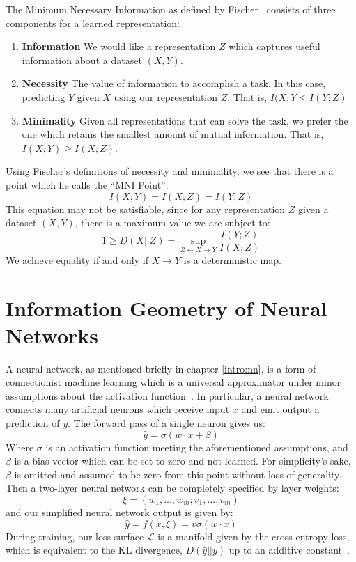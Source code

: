 The Minimum Necessary Information as defined by Fischer~\cite{fischer2020conditional} consists of three components for a learned representation:
\begin{enumerate}
	\item \textbf{Information} We would like a representation $Z$ which captures useful information about a dataset $(X, Y)$.
	\item \textbf{Necessity} The value of information to accomplish a task. In this case, predicting $Y$ given $X$ using our representation $Z$. That is, $I(X; Y \leq I(Y; Z)$
	\item \textbf{Minimality} Given all representations that can solve the task, we prefer the one which retains the smallest amount of mutual information. That is, $I(X; Y) \geq I(X; Z)$.
\end{enumerate}
Using Fischer's definitions of necessity and minimality, we see that there is a point which he calls the ``MNI Point'':
$$I(X; Y) = I(X; Z) = I(Y; Z)$$
This equation may not be satisfiable, since for any representation $Z$ given a dataset $(X, Y)$, there is a maximum value we are subject to:
$$1 \geq D(X||Z) = \sup_{Z \leftarrow X \rightarrow Y}\frac{I(Y; Z)}{I(X; Z)}$$
We achieve equality if and only if $X \to Y$ is a deterministic map.

\section{Information Geometry of Neural Networks}
A neural network, as mentioned briefly in chapter \ref{intro:nn}, is a form of connectionist machine learning which is a universal approximator under minor assumptions about the activation function~\cite{goodfellow2016deep}.
In particular, a neural network connects many artificial neurons which receive input $x$ and emit output a prediction of $y$. 
The forward pass of a single neuron gives us:
$$\hat{y} = \sigma(w \cdot x + \beta)$$
Where $\sigma$ is an activation function meeting the aforementioned assumptions, and $\beta$ is a bias vector which can be set to zero and not learned.
For simplicity's sake, $\beta$ is omitted and assumed to be zero from this point without loss of generality.
Then a two-layer neural network can be completely specified by layer weights:
$$\xi = (w_1, ..., w_m; v_1, ..., v_m)$$
and our simplified neural network output is given by:
$$\hat{y} = f(x, \xi) = v\sigma(w \cdot x)$$
During training, our loss surface $\mathcal{L}$ is a manifold given by the cross-entropy loss, which is equivalent to the KL divergence, $D(\hat{y}||y)$ up to an additive constant~\cite{goodfellow2016deep}.

